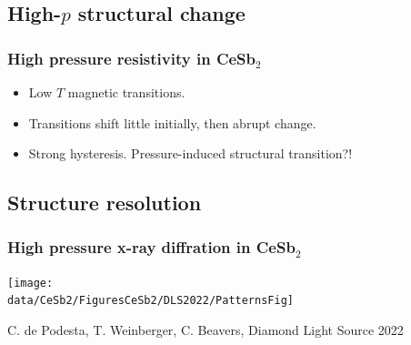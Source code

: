 \subsection{High-$p$ structural change}
\begin{frame}[label=CeSb2Res]
\frametitle{High pressure resistivity in CeSb$_2$}
\vspace{0em}
\centerline{}

\vspace{0em}
\begin{itemize}
\item <visible@1-> Low $T$ magnetic transitions.

\item <visible@2-> Transitions shift little initially, then abrupt change.


\item <visible@3-> Strong hysteresis. Pressure-induced structural transition?!
\end{itemize}

\end{frame}



\subsection{Structure resolution}

\begin{frame}[label=CeSb2xray-0]
\frametitle{High pressure x-ray diffration in CeSb$_2$}
\centerline{\texttt{[image: \\data/CeSb2/FiguresCeSb2/DLS2022/PatternsFig]}}

\vspace{0em}
\centerline{\makebox[\linewidth]{\rule{0.85\textwidth}{0.4pt}}}
\centerline{\scriptsize C. de Podesta, T. Weinberger, C. Beavers, Diamond Light Source 2022}


\end{frame}


